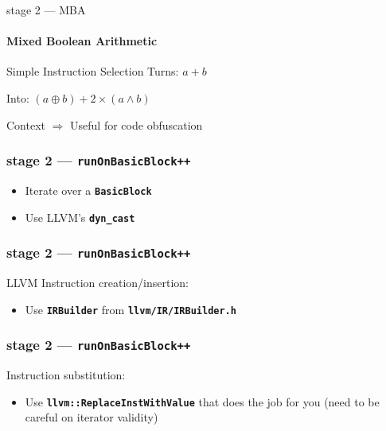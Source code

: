 \documentclass[14pt]{beamer}
\newcommand{\Code}[1]{\textbf{\texttt{#1}}}
\begin{document}
    \begin{frame}{stage 2 --- MBA}
        \framesubtitle{Mixed Boolean Arithmetic}

        \begin{alertblock}{Simple Instruction Selection}
            Turns: $a + b$

            Into: $(a \oplus b) + 2 \times (a \wedge b)$
        \end{alertblock}

        \begin{block}{Context}
            \alert{$\Rightarrow$} Useful for code obfuscation
        \end{block}

    \end{frame}

    \begin{frame}[containsverbatim]
    \frametitle{stage 2 --- \texttt{runOnBasicBlock++}}
    \begin{itemize}
        \item Iterate over a \Code{BasicBlock}
        \item Use LLVM's \Code{dyn\_cast}
    \end{itemize}
    {
        \footnotesize
        
    }
    \end{frame}

    \begin{frame}[containsverbatim]
    \frametitle{stage 2 --- \texttt{runOnBasicBlock++}}
    LLVM Instruction creation/insertion:
    \begin{itemize}
        \item Use \Code{IRBuilder} from \Code{llvm/IR/IRBuilder.h}
    \end{itemize}
    \hspace{-4.5em}%
    \begin{minipage}{\textwidth}
        \footnotesize
        
    \end{minipage}
    \end{frame}

    \begin{frame}[containsverbatim]
    \frametitle{stage 2 --- \texttt{runOnBasicBlock++}}
    Instruction substitution:
    \begin{itemize}
		\item Use \Code{llvm::ReplaceInstWithValue} that does the job for you
			(need to be careful on iterator validity)
    \end{itemize}
    \hspace{-4em}%
    \begin{minipage}{\textwidth}
        \footnotesize
        
    \end{minipage}
    \end{frame}
\end{document}

